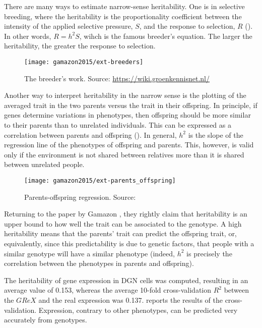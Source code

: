\documentclass[../main.tex]{subfiles}
\begin{document}
There are many ways to estimate narrow-sense heritability. One is in 
selective breeding, where the heritability is the proportionality 
coefficient between the intensity of the applied selective pressure, 
$S$, and the response to selection, $R$ (). In other 
words, $R = h^2 S$, wihch is the famous breeder's equation. The larger 
the heritability, the greater the response to selection.

\begin{figure}
	\centering
	\texttt{[image: gamazon2015/ext-breeders]}
	\caption{The breeder's work. Source: 
\url{https://wiki.groenkennisnet.nl/}}
\end{figure}

Another way to interpret heritability in the narrow sense is the 
plotting of the averaged trait in the two parents versus the trait in 
their offspring. In principle, if genes determine variations in 
phenotypes, then offspring should be more similar to their parents than 
to unrelated individuals. This can be expressed as a correlation between 
parents and offspring (). In general, $h^2$ is 
the slope of the regression line of the phenotypes of offspring and 
parents. This, however, is valid only if the environment is not shared 
between relatives more than it is shared between unrelated people.

\begin{figure}
	\centering
	\texttt{[image: gamazon2015/ext-parents\_offspring]}
	\caption{Parents-offspring regression. Source: 
\textcite{Visscher2008}}
\end{figure}

Returning to the paper by Gamazon \etal, they rightly claim that 
heritability is an upper bound to how well the trait can be associated 
to the genotype. A high heritability means that the parents' trait can 
predict the offspring trait, or, equivalently, since this predictability 
is due to genetic factors, that people with a similar genotype will have 
a similar phenotype (indeed, $h^2$ is precisely the correlation between 
the phenotypes in parents and offspring).

The heritability of gene expression in DGN cells was computed, resulting 
in an average value of 0.153, whereas the average 10-fold 
cross-validation $R^2$ between the $\widehat{GReX}$ and the real 
expression was 0.137.  reports the results of the 
cross-validation. Expression, contrary to other phenotypes, can be 
predicted very accurately from genotypes.
\end{document}
